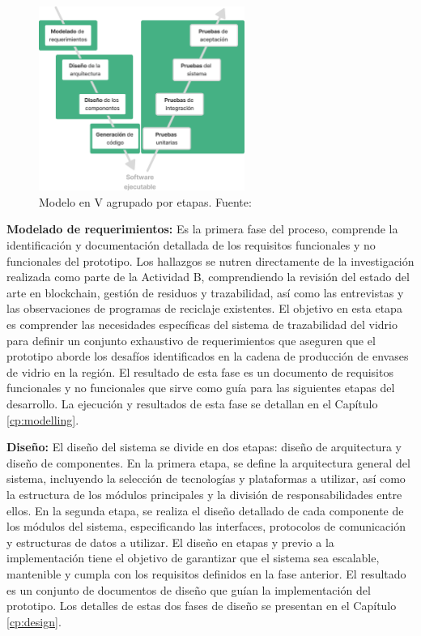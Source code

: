 \begin{figure}[!htb]
	\centering
	\includegraphics[width=0.6\textwidth]{Figures/model-v-grouped.png}
	\caption{Modelo en V agrupado por etapas. Fuente: \cite{pressman2010ingenieria}}
    \label{fig:methodology-v-grouped}
\end{figure}


\textbf{Modelado de requerimientos:}
Es la primera fase del proceso, comprende la identificación y documentación detallada de los requisitos funcionales y no funcionales del prototipo.
Los hallazgos se nutren directamente de la investigación realizada como parte de la Actividad B, comprendiendo la revisión del estado del arte en blockchain, gestión de residuos y trazabilidad, así como las entrevistas y las observaciones de programas de reciclaje existentes.
El objetivo en esta etapa es comprender las necesidades específicas del sistema de trazabilidad del vidrio para definir un conjunto exhaustivo de requerimientos que aseguren que el prototipo aborde los desafíos identificados en la cadena de producción de envases de vidrio en la región.
El resultado de esta fase es un documento de requisitos funcionales y no funcionales que sirve como guía para las siguientes etapas del desarrollo.
La ejecución y resultados de esta fase se detallan en el Capítulo \ref{cp:modelling}.

\textbf{Diseño:}
El diseño del sistema se divide en dos etapas: diseño de arquitectura y diseño de componentes.
En la primera etapa, se define la arquitectura general del sistema, incluyendo la selección de tecnologías y plataformas a utilizar, así como la estructura de los módulos principales y la división de responsabilidades entre ellos.
En la segunda etapa, se realiza el diseño detallado de cada componente de los módulos del sistema, especificando las interfaces, protocolos de comunicación y estructuras de datos a utilizar.
El diseño en etapas y previo a la implementación tiene el objetivo de garantizar que el sistema sea escalable, mantenible y cumpla con los requisitos definidos en la fase anterior.
El resultado es un conjunto de documentos de diseño que guían la implementación del prototipo.
Los detalles de estas dos fases de diseño se presentan en el Capítulo \ref{cp:design}.

